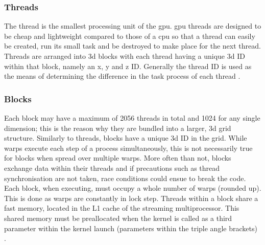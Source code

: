 \subsubsection{Threads}\label{gpu:ssec:thread}
The thread is the smallest processing unit of the \gls{gpu}. \gls{gpu} threads are designed to be cheap and lightweight compared to those of a \gls{cpu} so that a thread can easily be created, run its small task and be destroyed to make place for the next thread. Threads are arranged into \gls{3d} blocks with each thread having a unique \gls{3d} ID within that block, namely an x, y and z ID. Generally the thread ID is used as the means of determining the difference in the task process of each thread \citep{CUDA}.
%
\subsubsection{Blocks}\label{gpu:ssec:block}
Each block may have a maximum of 2056 threads in total and 1024 for any single dimension; this is the reason why they are bundled into a larger, \gls{3d} grid structure. Similarly to threads, blocks have a unique \gls{3d} ID in the grid. While warps execute each step of a process simultaneously, this is not necessarily true for blocks when spread over multiple warps. More often than not, blocks exchange data within their threads and if precautions such as thread synchronisation are not taken, race conditions could ensue to break the code. Each block, when executing, must occupy a whole number of warps (rounded up). This is done as warps are constantly in lock step. Threads within a block share a fast memory, located in the L1 cache of the streaming multiprocessor. This shared memory must be preallocated when the kernel is called as a third parameter within the kernel launch (parameters within the triple angle brackets) \citep{CUDA}.
%
